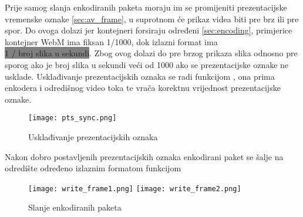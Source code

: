 \clearpage
{}
Prije samog slanja enkodiranih paketa moraju im se promijeniti prezentacijske vremenske oznake \ref{sec:av_frame}, u
suprotnom će prikaz videa biti pre brz ili pre spor.
\paraBreak
Do ovoga dolazi jer kontejneri forsiraju određeni  \ref{sec:encoding}, primjerice kontejner WebM ima
fiksan  1/1000, \cite{ffmpegBook} dok izlazni format ima \\ 
\colorbox{gray}{1 / broj slika u sekundi}.  Zbog ovog dolazi  do pre brzog prikaza slika odnosno pre sporog ako je broj
slika u sekundi veći od 1000 ako se prezentacijske oznake ne usklade.
\paraBreak
Usklađivanje prezentacijskih oznaka se radi funkcijom , ona prima  enkodera
i  odredišnog video toka te vrača korektnu vrijednost prezentacijske oznake.
\begin{figure}[h]
  \texttt{[image: pts\_sync.png]}
  \caption{Usklađivanje prezentacijskih oznaka}
\end{figure}
\noindent
Nakon dobro postavljenih prezentacijskih oznaka enkodirani paket se šalje na odredište određeno izlaznim formatom
funkcijom 
\begin{figure}[h]
  \texttt{[image: write\_frame1.png]}
  \texttt{[image: write\_frame2.png]}
  \caption{Slanje enkodiranih paketa}
\end{figure}